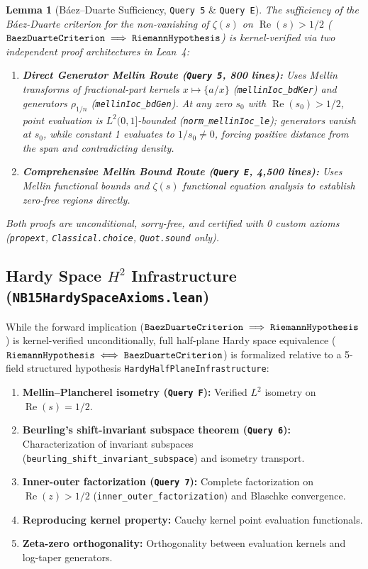 \documentclass[11pt,a4paper]{article}
\theoremstyle{plain}
\newtheorem{lemma}[theorem]{Lemma}
\theoremstyle{definition}
\theoremstyle{remark}
\DeclareMathOperator{\RePart}{Re}
\renewcommand{\Re}{\RePart}
\begin{document}
\begin{lemma}[Báez--Duarte Sufficiency, \texttt{Query 5} \& \texttt{Query E}]
The sufficiency of the B\'aez-Duarte criterion for the non-vanishing of $\zeta(s)$ on $\Re(s) > 1/2$ ($\text{\texttt{BaezDuarteCriterion}} \implies \text{\texttt{RiemannHypothesis}}$) is kernel-verified via two independent proof architectures in Lean~4:
\begin{enumerate}[label=\textbf{(\alph*)}]
  \item \textbf{Direct Generator Mellin Route (\texttt{Query 5}, 800 lines):} Uses Mellin transforms of fractional-part kernels $x \mapsto \{a/x\}$ (\texttt{mellinIoc\_bdKer}) and generators $\rho_{1/n}$ (\texttt{mellinIoc\_bdGen}). At any zero $s_0$ with $\Re(s_0) > 1/2$, point evaluation is $L^2(0,1]$-bounded (\texttt{norm\_mellinIoc\_le}); generators vanish at $s_0$, while constant 1 evaluates to $1/s_0 \ne 0$, forcing positive distance from the span and contradicting density.
  \item \textbf{Comprehensive Mellin Bound Route (\texttt{Query E}, 4,500 lines):} Uses Mellin functional bounds and $\zeta(s)$ functional equation analysis to establish zero-free regions directly.
\end{enumerate}
Both proofs are unconditional, sorry-free, and certified with 0 custom axioms (\texttt{propext}, \texttt{Classical.choice}, \texttt{Quot.sound} only).
\end{lemma}

\subsection{Hardy Space $H^2$ Infrastructure (\texttt{NB15HardySpaceAxioms.lean})}

While the forward implication ($\text{\texttt{BaezDuarteCriterion}} \implies \text{\texttt{RiemannHypothesis}}$) is kernel-verified unconditionally, full half-plane Hardy space equivalence ($\text{\texttt{RiemannHypothesis}} \iff \text{\texttt{BaezDuarteCriterion}}$) is formalized relative to a 5-field structured hypothesis \texttt{HardyHalfPlaneInfrastructure}:
\begin{enumerate}[label=\textbf{\arabic*.}]
  \item \textbf{Mellin--Plancherel isometry (\texttt{Query F}):} Verified $L^2$ isometry on $\Re(s) = 1/2$.
  \item \textbf{Beurling's shift-invariant subspace theorem (\texttt{Query 6}):} Characterization of invariant subspaces (\texttt{beurling\_shift\_invariant\_subspace}) and isometry transport.
  \item \textbf{Inner-outer factorization (\texttt{Query 7}):} Complete factorization on $\Re(z) > 1/2$ (\texttt{inner\_outer\_factorization}) and Blaschke convergence.
  \item \textbf{Reproducing kernel property:} Cauchy kernel point evaluation functionals.
  \item \textbf{Zeta-zero orthogonality:} Orthogonality between evaluation kernels and log-taper generators.
\end{enumerate}
\end{document}
